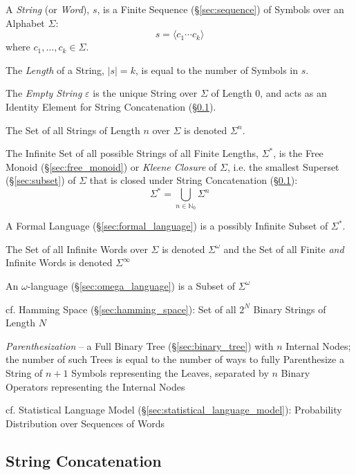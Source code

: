 A \emph{String} (or \emph{Word}), $s$, is a Finite Sequence
(\S\ref{sec:sequence}) of Symbols over an Alphabet $\Sigma$:
\[
  s = \langle c_1 \cdots c_k \rangle
\]
where $c_1, \ldots, c_k \in \Sigma$.

The \emph{Length} of a String, $|s| = k$, is equal to the number of Symbols in
$s$.

The \emph{Empty String} $\varepsilon$ is the unique String over $\Sigma$ of
Length 0, and acts as an Identity Element for String Concatenation
(\S\ref{sec:string_concatenation}).

The Set of all Strings of Length $n$ over $\Sigma$ is denoted $\Sigma^n$.

The Infinite Set of all possible Strings of all Finite Lengths, $\Sigma^*$, is
the Free Monoid (\S\ref{sec:free_monoid}) or \emph{Kleene Closure} of $\Sigma$,
i.e. the smallest Superset (\S\ref{sec:subset}) of $\Sigma$ that is closed under
String Concatenation (\S\ref{sec:string_concatenation}):
\[
  \Sigma^* = \bigcup_{n\in\mathbb{N}_0} \Sigma^n
\]

A Formal Language (\S\ref{sec:formal_language}) is a possibly Infinite Subset of
$\Sigma^*$.

The Set of all Infinite Words over $\Sigma$ is denoted $\Sigma^\omega$ and the
Set of all Finite \emph{and} Infinite Words is denoted $\Sigma^\infty$

An $\omega$-language (\S\ref{sec:omega_language}) is a Subset of $\Sigma^\omega$

\fist cf. Hamming Space (\S\ref{sec:hamming_space}): Set of all $2^N$ Binary
Strings of Length $N$

\emph{Parenthesization} -- a Full Binary Tree (\S\ref{sec:binary_tree}) with $n$
Internal Nodes; the number of such Trees is equal to the number of ways to fully
Parenthesize a String of $n+1$ Symbols representing the Leaves, separated by $n$
Binary Operators representing the Internal Nodes

\fist cf. Statistical Language Model (\S\ref{sec:statistical_language_model}):
Probability Distribution over Sequences of Words



\subsection{String Concatenation}\label{sec:string_concatenation}

